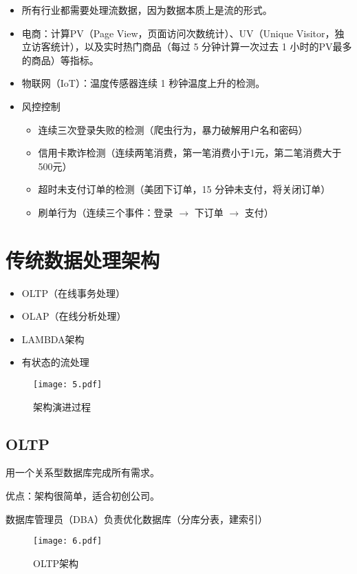 \documentclass[cn,11pt,chinese]{elegantbook}
\begin{document}
\begin{itemize}
  \item 所有行业都需要处理流数据，因为数据本质上是流的形式。
  \item 电商：计算PV（Page View，页面访问次数统计）、UV（Unique Visitor，独立访客统计），以及实时热门商品（每过 5 分钟计算一次过去 1 小时的PV最多的商品）等指标。
  \item 物联网（IoT）：温度传感器连续 1 秒钟温度上升的检测。
  \item 风控控制
  \begin{itemize}
    \item 连续三次登录失败的检测（爬虫行为，暴力破解用户名和密码）
    \item 信用卡欺诈检测（连续两笔消费，第一笔消费小于1元，第二笔消费大于500元）
    \item 超时未支付订单的检测（美团下订单，15 分钟未支付，将关闭订单）
    \item 刷单行为（连续三个事件：登录 $\rightarrow$ 下订单 $\rightarrow$ 支付）
  \end{itemize}
\end{itemize}

\section{传统数据处理架构}

\begin{itemize}
  \item OLTP（在线事务处理）
  \item OLAP（在线分析处理）
  \item LAMBDA架构
  \item 有状态的流处理
\end{itemize}

\begin{figure}[htbp]
  \centering
  \texttt{[image: 5.pdf]}
  \caption{架构演进过程}
\end{figure}

\subsection{OLTP}

用一个关系型数据库完成所有需求。

优点：架构很简单，适合初创公司。

数据库管理员（DBA）负责优化数据库（分库分表，建索引）
\begin{figure}[htbp]
  \centering
  \texttt{[image: 6.pdf]}
  \caption{OLTP架构}
\end{figure}
\end{document}
